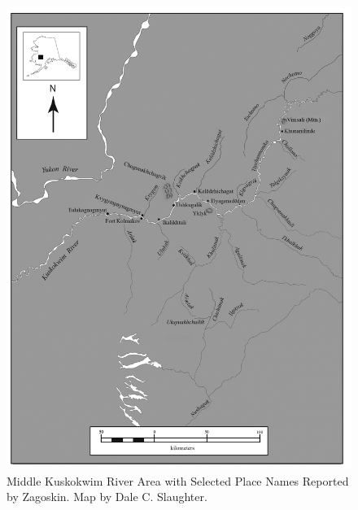 \begin{figure}[!ht]
    \centering
    \includegraphics[width=\textwidth]{figures/pratt-fig6.png}
\caption{Middle Kuskokwim River Area with Selected Place Names Reported by Zagoskin. Map by Dale C. Slaughter.}
\label{pratt-fig6}
\end{figure}
\clearpage
